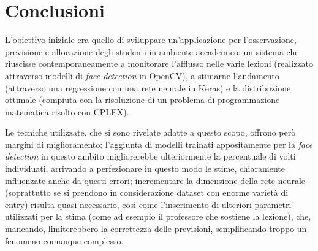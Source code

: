 \chapter{Conclusioni}

L'obiettivo iniziale era quello di sviluppare un'applicazione per l'osservazione, previsione e 
allocazione degli studenti in ambiente accademico: un sistema che riuscisse contemporaneamente a 
monitorare l'afflusso nelle varie lezioni (realizzato attraverso modelli di \textit{face detection} 
in OpenCV), a stimarne l'andamento (attraverso una regressione con una rete neurale in Keras) e 
la distribuzione ottimale (compiuta con la risoluzione di un problema di programmazione matematica
risolto con CPLEX).

\smallskip

Le tecniche utilizzate, che si sono rivelate adatte a questo scopo, offrono però margini di miglioramento:
l'aggiunta di modelli trainati appositamente per la \textit{face detection} in questo ambito migliorerebbe 
ulteriormente la percentuale di volti individuati, arrivando a perfezionare in questo modo le stime,
chiaramente influenzate anche da questi errori; incrementare la dimensione della rete neurale (soprattutto se si 
prendono in considerazione dataset con enorme varietà di entry) risulta quasi necessario, così come 
l'inserimento di ulteriori parametri utilizzati per la stima (come ad esempio il professore che sostiene 
la lezione), che, mancando, limiterebbero la correttezza delle previsioni, semplificando troppo
un fenomeno comunque complesso.

